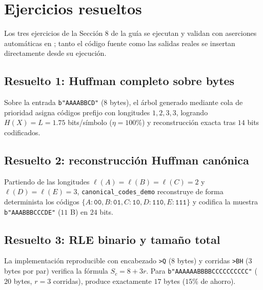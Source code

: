 \section{Ejercicios resueltos}
Los tres ejercicios de la Sección 8 de la guía se ejecutan y validan con aserciones automáticas en ; tanto el código fuente como las salidas reales se insertan directamente desde su ejecución.

\subsection{Resuelto 1: Huffman completo sobre bytes}
Sobre la entrada \texttt{b"AAAABBCD"} ($8$ bytes), el árbol generado mediante cola de prioridad asigna códigos prefijo con longitudes $1, 2, 3, 3$, logrando $H(X) = L = 1.75$ bits/símbolo ($\eta = 100$\%) y reconstrucción exacta tras $14$ bits codificados.


\subsection{Resuelto 2: reconstrucción Huffman canónica}
Partiendo de las longitudes $\ell(A)=\ell(B)=\ell(C)=2$ y $\ell(D)=\ell(E)=3$, \texttt{canonical\_codes\_demo} reconstruye de forma determinista los códigos $\{A:\texttt{00}, B:\texttt{01}, C:\texttt{10}, D:\texttt{110}, E:\texttt{111}\}$ y codifica la muestra \texttt{b"AAABBBCCCDE"} ($11$ B) en $24$ bits.


\subsection{Resuelto 3: RLE binario y tamaño total}
La implementación reproducible con encabezado \texttt{>Q} ($8$ bytes) y corridas \texttt{>BH} ($3$ bytes por par) verifica la fórmula $S_c = 8 + 3r$. Para \texttt{b"AAAAAABBBBCCCCCCCCCC"} ($20$ bytes, $r=3$ corridas), produce exactamente $17$ bytes ($15$\% de ahorro).

